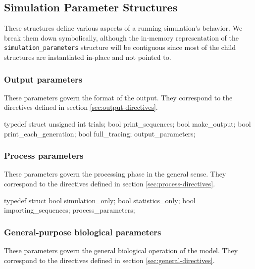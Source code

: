 \documentclass{article}
\begin{document}
    \subsection{Simulation Parameter Structures}
      \label{sec:full-simulation-parameters}

      These structures define various aspects of a running simulation's
      behavior. We break them down symbolically, although the in-memory
      representation of the \verb|simulation_parameters| structure will be
      contiguous since most of the child structures are instantiated in-place
      and not pointed to.

      \subsubsection{Output parameters}
	\label{sec:output-parameters}

	These parameters govern the format of the output. They correspond to the
	directives defined in section \ref{sec:output-directives}.

\begin{ccode}
typedef struct {
  unsigned int		trials;
  bool			print_sequences;
  bool			make_output;
  bool			print_each_generation;
  bool			full_tracing;
} output_parameters;
\end{ccode}

      \subsubsection{Process parameters}
	\label{sec:process-parameters}

	These parameters govern the processing phase in the general sense. They
	correspond to the directives defined in section
	\ref{sec:process-directives}.

\begin{ccode}
typedef struct {
  bool			simulation_only;
  bool			statistics_only;
  bool			importing_sequences;
} process_parameters;
\end{ccode}

      \subsubsection{General-purpose biological parameters}
	\label{sec:general-parameters}

	These parameters govern the general biological operation of the model.
	They correspond to the directives defined in section
	\ref{sec:general-directives}.
\end{document}
